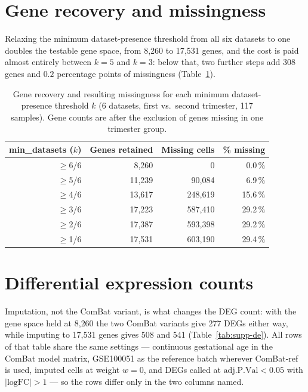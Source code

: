 \documentclass[11pt,a4paper]{article}
\begin{document}
\section{Gene recovery and missingness}
\label{sec:supp-recovery}

Relaxing the minimum dataset-presence threshold from all six
datasets to one doubles the testable gene space, from 8{,}260
to 17{,}531 genes, and the cost is paid almost entirely between
$k = 5$ and $k = 3$: below that, two further steps add 308
genes and $0.2$ percentage points of missingness
(Table~\ref{tab:supp-recovery}).

\begin{table}[htbp]
\centering
\footnotesize
\begin{tabular}{@{}rrrr@{}}
\toprule
\textbf{min\_datasets ($k$)} & \textbf{Genes retained} &
  \textbf{Missing cells} & \textbf{\% missing} \\
\midrule
$\ge$6/6 &  8{,}260 &         0 &  0.0\,\% \\
$\ge$5/6 & 11{,}239 &  90{,}084 &  6.9\,\% \\
$\ge$4/6 & 13{,}617 & 248{,}619 & 15.6\,\% \\
$\ge$3/6 & 17{,}223 & 587{,}410 & 29.2\,\% \\
$\ge$2/6 & 17{,}387 & 593{,}398 & 29.2\,\% \\
$\ge$1/6 & 17{,}531 & 603{,}190 & 29.4\,\% \\
\bottomrule
\end{tabular}
\caption{Gene recovery and resulting missingness for each
  minimum dataset-presence threshold $k$ (6 datasets, first vs.~second trimester, 117 samples). Gene counts are after the exclusion of genes
  missing in one trimester group.}
\label{tab:supp-recovery}
\end{table}

\section{Differential expression counts}
\label{sec:supp-de}

Imputation, not the ComBat variant, is what changes the DEG
count: with the gene space held at 8{,}260 the two ComBat
variants give 277 DEGs either way, while imputing to 17{,}531
genes gives 508 and 541 (Table~\ref{tab:supp-de}). All rows of
that table share the same settings --- continuous gestational
age in the ComBat model matrix, GSE100051 as the reference
batch wherever ComBat-ref is used, imputed cells at weight
$w = 0$, and DEGs called at $\text{adj.P.Val} < 0.05$ with
$|\text{logFC}| > 1$ --- so the rows differ only in the two
columns named.
\end{document}
